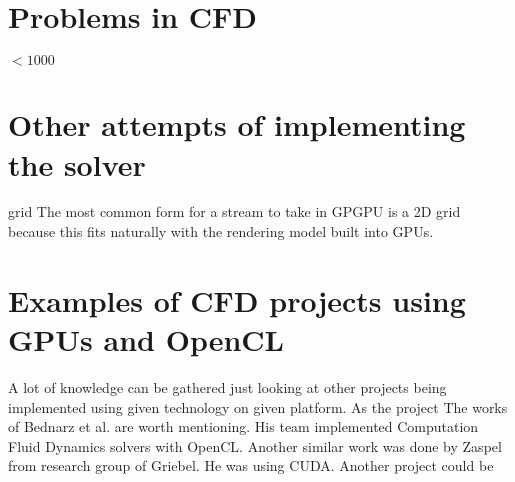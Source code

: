 \section{Problems in CFD}


 $< 1000$

\section{Other attempts of implementing the solver}

grid The most common form for a stream to take in GPGPU is a 2D grid because this fits naturally with the rendering model built into GPUs. 

\section{Examples of CFD projects using GPUs and OpenCL}
A lot of knowledge can be gathered just looking at other projects being implemented using given technology on given platform. As the project  The works of Bednarz et al. are worth mentioning. His team implemented Computation Fluid Dynamics solvers with OpenCL. Another similar work was done by Zaspel from research group of Griebel. He was using CUDA. Another project could be 





